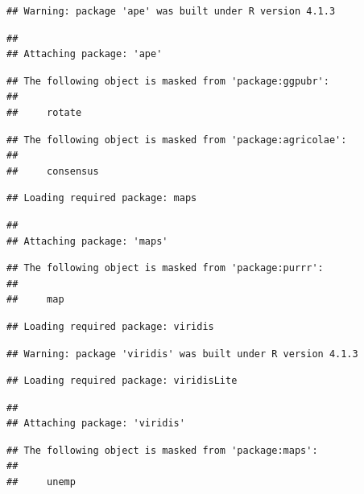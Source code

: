 \documentclass[
]{book}
\theoremstyle{definition}
\theoremstyle{definition}
\theoremstyle{definition}
\theoremstyle{definition}
\theoremstyle{remark}
\begin{document}
\begin{verbatim}
## Warning: package 'ape' was built under R version 4.1.3
\end{verbatim}

\begin{verbatim}
## 
## Attaching package: 'ape'
\end{verbatim}

\begin{verbatim}
## The following object is masked from 'package:ggpubr':
## 
##     rotate
\end{verbatim}

\begin{verbatim}
## The following object is masked from 'package:agricolae':
## 
##     consensus
\end{verbatim}

\begin{verbatim}
## Loading required package: maps
\end{verbatim}

\begin{verbatim}
## 
## Attaching package: 'maps'
\end{verbatim}

\begin{verbatim}
## The following object is masked from 'package:purrr':
## 
##     map
\end{verbatim}

\begin{verbatim}
## Loading required package: viridis
\end{verbatim}

\begin{verbatim}
## Warning: package 'viridis' was built under R version 4.1.3
\end{verbatim}

\begin{verbatim}
## Loading required package: viridisLite
\end{verbatim}

\begin{verbatim}
## 
## Attaching package: 'viridis'
\end{verbatim}

\begin{verbatim}
## The following object is masked from 'package:maps':
## 
##     unemp
\end{verbatim}

  
\end{document}
